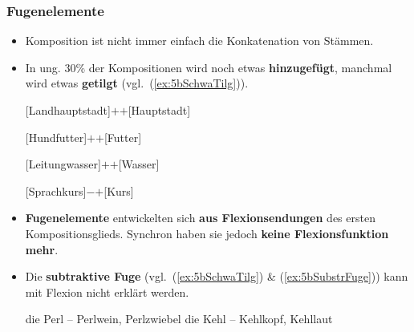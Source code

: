 \begin{frame}
\frametitle{Fugenelemente}

\begin{itemize}
	\item Komposition ist nicht immer einfach die Konkatenation von Stämmen.
	
	\item In ung. 30\% der Kompositionen wird noch etwas \textbf{hinzugefügt}, manchmal wird etwas \textbf{getilgt} (vgl.\ (\ref{ex:5bSchwaTilg})).
	
	\settowidth{} 
	\eal 
		\ex %
		 {[Landhauptstadt]$+$$+$[Hauptstadt]}
		 
		\ex %
		 {[Hundfutter]$+$$+$[Futter]}
		 
		\ex %
		 {[Leitungwasser]$+$$+$[Wasser]}
		 
		\ex\label{ex:5bSchwaTilg} %
		 {[Sprach\alertred{\_}kurs]$-$$+$[Kurs]}
	\zl
		 
\pause

	\item \textbf{Fugenelemente} entwickelten sich \textbf{aus Flexionsendungen} des ersten Kompositionsglieds. Synchron haben sie jedoch \textbf{keine Flexionsfunktion mehr}.
	
	\item Die \textbf{subtraktive Fuge} (vgl.\ (\ref{ex:5bSchwaTilg}) \& (\ref{ex:5bSubstrFuge})) kann mit Flexion nicht erklärt werden.
	
	\eal \label{ex:5bSubstrFuge}
	\ex die Perl -- Perl\alertred{\_}wein, Perl\alertred{\_}zwiebel
	\ex die Kehl -- Kehl\alertred{\_}kopf, Kehl\alertred{\_}laut
	\zl
	
\end{itemize}

\end{frame}


